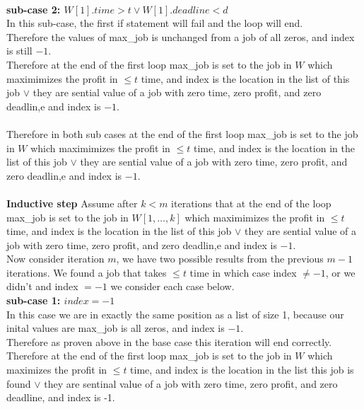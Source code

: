 \documentclass{article}
\begin{document}
        \\
        \textbf{sub-case 2: $W[1].time > t \lor W[1].deadline < d$}\\
        \indent In this sub-case, the first if statement will fail and the loop will end.\\
        \indent Therefore the values of max\_job is unchanged from a job of all zeros, and index is still $-1$.\\
        \indent Therefore at the end of the first loop max\_job is set to the job in $W$ which maximimizes the profit in $\leq t$ time, and index is the location in the list of this job $\lor$ they are sential value of a job with zero time, zero profit, and zero deadlin,e and index is $-1$.\\
        \\
        Therefore in both sub cases at the end of the first loop max\_job is set to the job in $W$ which maximimizes the profit in $\leq t$ time, and index is the location in the list of this job $\lor$ they are sential value of a job with zero time, zero profit, and zero deadlin,e and index is $-1$.\\
        \\
        \textbf{Inductive step} Assume after $k < m$ iterations that at the end of the loop max\_job is set to the job in $W[1, \ldots, k]$ which maximimizes the profit in $\leq t$ time, and index is the location in the list of this job $\lor$ they are sential value of a job with zero time, zero profit, and zero deadlin,e and index is $-1$.\\
        Now consider iteration $m$, we have two possible results from the previous $m - 1$ iterations. We found a job that takes $\leq t$ time in which case index $\neq -1$, or we didn't and index $= -1$ we consider each case below.\\
        \textbf{sub-case 1: $index = -1$}\\
        \indent In this case we are in exactly the same position as a list of size 1, because our inital values are max\_job is all zeros, and index is $-1$.\\
        \indent Therefore as proven above in the base case this iteration will end correctly.\\
        \indent Therefore at the end of the first loop max\_job is set to the job in $W$ which maximizes the profit in $\leq t$ time, and index is the location in the list this job is found $\lor$ they are sentinal value of a job with zero time, zero profit, and zero deadline, and index is -1.\\
\end{document}

